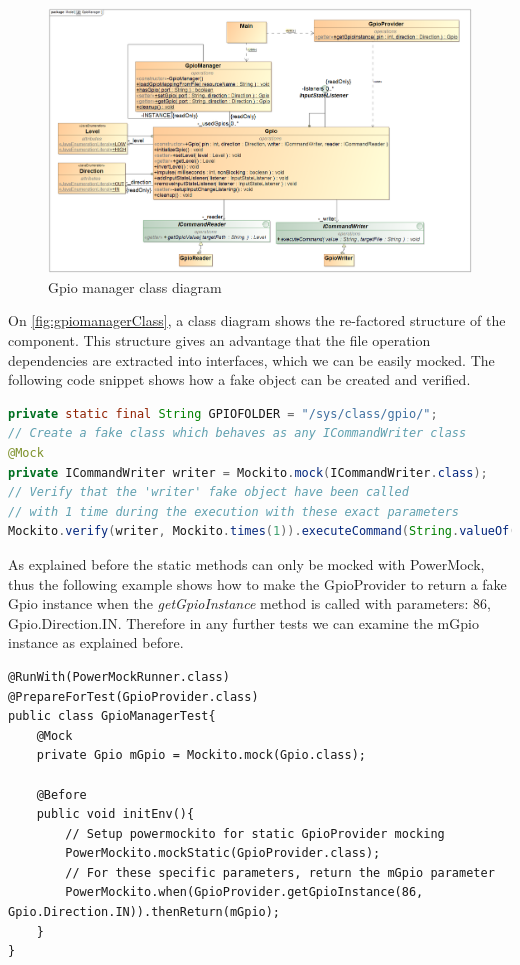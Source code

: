 \begin{figure}[ht]
	\centering
	\includegraphics[width=150mm, keepaspectratio]{figures/impl/GpioManager.png}
	\caption{Gpio manager class diagram}
	\label{fig:gpiomanagerClass}
\end{figure}
On \autoref{fig:gpiomanagerClass}, a class diagram shows the re-factored structure of the component. This structure gives an advantage that the file operation dependencies are extracted into interfaces, which we can be easily mocked. The following code snippet shows how a fake object can be created and verified. 

\begin{lstlisting}[language = Java]
private static final String GPIOFOLDER = "/sys/class/gpio/";
// Create a fake class which behaves as any ICommandWriter class
@Mock
private ICommandWriter writer = Mockito.mock(ICommandWriter.class);
// Verify that the 'writer' fake object have been called 
// with 1 time during the execution with these exact parameters
Mockito.verify(writer, Mockito.times(1)).executeCommand(String.valueOf(67), GPIOFOLDER + "export");
\end{lstlisting}

As explained before the static methods can only be mocked with PowerMock, thus the following example shows how to make the GpioProvider to return a fake Gpio instance when the \textit{getGpioInstance} method is called with parameters: 86, Gpio.Direction.IN. Therefore in any further tests we can examine the mGpio instance as explained before.

\begin{lstlisting}
@RunWith(PowerMockRunner.class)
@PrepareForTest(GpioProvider.class)
public class GpioManagerTest{
	@Mock
	private Gpio mGpio = Mockito.mock(Gpio.class);
	
	@Before
	public void initEnv(){
		// Setup powermockito for static GpioProvider mocking
		PowerMockito.mockStatic(GpioProvider.class);
		// For these specific parameters, return the mGpio parameter
		PowerMockito.when(GpioProvider.getGpioInstance(86, Gpio.Direction.IN)).thenReturn(mGpio);
	}
}
\end{lstlisting}

